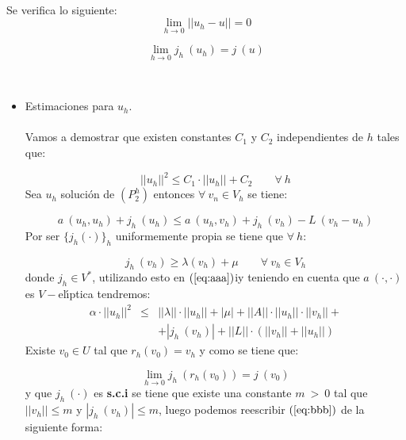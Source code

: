 \begin{teorema}
\ \\
Se verifica lo siguiente:
\begin{equation}\label{eq:convergenciaEVIIIa}
\lim_{h\to 0}||u_h-u|| = 0
\end{equation}

\begin{equation}\label{eq:convergenciaEVIIIb}
\lim_{h\to 0} j_h\ (u_h) =j\ (u)
\end{equation}
\end{teorema}

\begin{demosteorema}
\ \\
\begin{itemize}
\item Estimaciones para $u_h$.\\ \\
Vamos a demostrar que existen constantes $C_1$ y $C_2$ independientes de $h$
tales que:

\begin{displaymath}
||u_h||^2\le C_1 \cdot ||u_h|| + C_2 \qquad \forall \ h
\end{displaymath}
Sea $u_h$ soluci\'on de $(P_2^h)$ entonces $\forall \ v_n \in V_h$ se tiene:

\begin{equation}\label{eq:aaa}
a\ (u_h,u_h)+j_h\ (u_h)\le a\ (u_h,v_h)+j_h\ (v_h)-L\ (v_h-u_h)
\end{equation}
Por ser $\{j_h (\cdot )\}_h$ uniformemente propia se tiene que $\forall \ h$:

\begin{displaymath}
j_h\ (v_h) \ge \lambda (v_h)+\mu\qquad \forall \ v_h \in V_h
\end{displaymath}
donde $j_h \in V^*$, utilizando esto en $(\ref{eq:aaa})$iy teniendo en cuenta
que $a\ (\cdot ,\cdot )$ es $V-$el\'{\i}ptica tendremos:
\begin{eqnarray}\label{eq:bbb}
\alpha \cdot ||u_h||^2 &\le & ||\lambda ||\cdot ||u_h || + |\mu |+||A||\cdot
||u_h||\cdot ||v_h|| + \\ \nonumber
& & + |j_h\ (v_h)| + ||L||\cdot (||v_h||+||u_h||)
\end{eqnarray}
Existe $v_0 \in U$ tal que $r_h(v_0)=v_h$ y como se tiene que:

\begin{displaymath}
\lim_{h\to 0} j_h\ (r_h(v_0)) = j\ (v_0)
\end{displaymath}
y que $j_h\ (\cdot )$ es \textbf{s.c.i} se tiene que existe una constante
$m\ >\ 0$ tal que $||v_h|| \le m$ y $|j_h\ (v_h)|\le m$, luego podemos
reescribir $(\ref{eq:bbb})$ de la siguiente forma:


\end{itemize}
\end{demosteorema}
